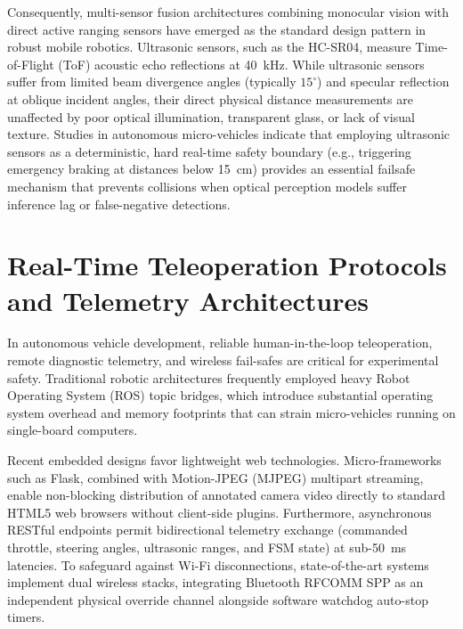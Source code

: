 Consequently, multi-sensor fusion architectures combining monocular vision with direct active ranging sensors have emerged as the standard design pattern in robust mobile robotics. Ultrasonic sensors, such as the HC-SR04, measure Time-of-Flight (ToF) acoustic echo reflections at 40~kHz. While ultrasonic sensors suffer from limited beam divergence angles (typically $15^\circ$) and specular reflection at oblique incident angles, their direct physical distance measurements are unaffected by poor optical illumination, transparent glass, or lack of visual texture. Studies in autonomous micro-vehicles indicate that employing ultrasonic sensors as a deterministic, hard real-time safety boundary (e.g., triggering emergency braking at distances below 15~cm) provides an essential failsafe mechanism that prevents collisions when optical perception models suffer inference lag or false-negative detections.

\section{Real-Time Teleoperation Protocols and Telemetry Architectures}
In autonomous vehicle development, reliable human-in-the-loop teleoperation, remote diagnostic telemetry, and wireless fail-safes are critical for experimental safety. Traditional robotic architectures frequently employed heavy Robot Operating System (ROS) topic bridges, which introduce substantial operating system overhead and memory footprints that can strain micro-vehicles running on single-board computers.

Recent embedded designs favor lightweight web technologies. Micro-frameworks such as Flask, combined with Motion-JPEG (MJPEG) multipart streaming, enable non-blocking distribution of annotated camera video directly to standard HTML5 web browsers without client-side plugins. Furthermore, asynchronous RESTful endpoints permit bidirectional telemetry exchange (commanded throttle, steering angles, ultrasonic ranges, and FSM state) at sub-50~ms latencies. To safeguard against Wi-Fi disconnections, state-of-the-art systems implement dual wireless stacks, integrating Bluetooth RFCOMM SPP as an independent physical override channel alongside software watchdog auto-stop timers.
